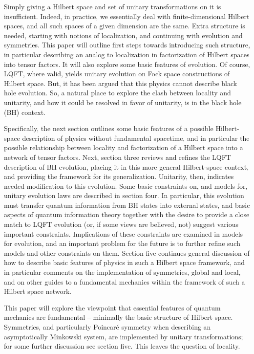 Simply giving a Hilbert space and set of unitary transformations on it is insufficient.  Indeed, in practice, we essentially deal with finite-dimensional Hilbert spaces, and all such spaces of a given dimension are the same.  Extra structure is needed, starting with notions of localization, and continuing with evolution and symmetries.  This paper will outline first steps towards introducing such structure, in particular describing an analog to localization in factorization of Hilbert spaces into tensor factors.  It will also explore some basic features of evolution.  Of course, LQFT, where valid, yields unitary evolution on Fock space constructions of Hilbert space.  But, it has been argued that this physics cannot describe black hole evolution.  So, a natural place to explore the clash between locality and unitarity, and how it could be resolved in favor of unitarity, is in the black hole (BH) context. 

Specifically, the next section outlines some basic features of a possible Hilbert-space description of physics without fundamental spacetime, and in particular
 the possible relationship between locality and factorization of a Hilbert space into a network of tensor factors.  Next, section three reviews and refines the LQFT description of BH evolution, placing it in this more general Hilbert-space context, and providing the framework for its generalization.  Unitarity, then, indicates needed modification to this evolution.  Some basic constraints on, and models for, unitary evolution laws are described in section four.  In particular, this evolution must transfer quantum information from BH states into external states, and basic aspects  of quantum information theory together with the desire to provide a close match to LQFT evolution (or, if some views are believed, not) suggest various important constraints.  Implications of these constraints are examined in models for evolution, and an important problem for the future is to further refine such models and other constraints on them.  Section five continues general discussion of how to describe basic features of physics in such a Hilbert space framework, and in particular comments on the implementation of symmetries, global and local, and on other guides to a fundamental mechanics within the framework of such a Hilbert space network.





This paper will explore the viewpoint that essential features of quantum mechanics are fundamental -- minimally the basic structure of Hilbert space.  Symmetries, and particularly Poincar\'e symmetry when describing an asymptotically Minkowski system, are implemented by unitary transformations; for some further discussion see section five.  This leaves the question of locality.

